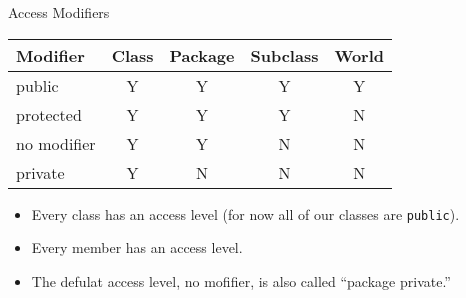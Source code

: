 \documentclass{beamer}
\author[Chris Simpkins] 
{Christopher Simpkins \\\texttt{chris.simpkins@gatech.edu}}
\institute[Georgia Tech] %
\date[CS 1331]{}
\begin{document}
\begin{frame}
  \titlepage
\end{frame}

\begin{frame}[fragile]{Access Modifiers}


\begin{center}
\begin{tabular}{|l|c|c|c|c|} \hline
Modifier & Class & Package & Subclass & World\\
\hline
public & Y & Y & Y & Y\\
protected & Y & Y & Y & N\\
no modifier & Y & Y & N & N\\
private & Y & N & N & N\\
\hline
\end{tabular}
\end{center}

\begin{itemize}
\item Every class has an access level (for now all of our classes are {\tt public}).
\item Every member has an access level.
\item The defulat access level, no mofifier, is also called ``package private.''
\end{itemize}

\end{frame}




\end{document}
